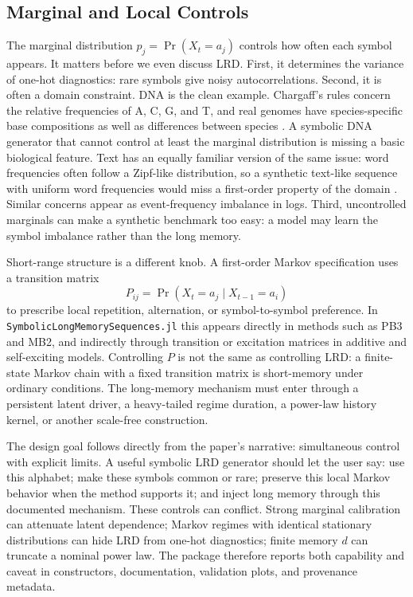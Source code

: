 \documentclass[journal]{IEEEtran}
\newcommand{\pkg}[1]{\texttt{#1}}
\newcommand{\sfive}{\pkg{SymbolicLongMemorySequences.jl}}
\begin{document}
\subsection{Marginal and Local Controls}

The marginal distribution \(p_j=\Pr(X_t=a_j)\) controls how often each symbol
appears.  It matters before we even discuss LRD.  First, it determines the
variance of one-hot diagnostics: rare symbols give noisy autocorrelations.
Second, it is often a domain constraint.  DNA is the clean example.  Chargaff's
rules concern the relative frequencies of A, C, G, and T, and real genomes have
species-specific base compositions as well as differences between species
\cite{chargaff1950_chemical}.  A symbolic DNA generator that cannot control at
least the marginal distribution is missing a basic biological feature.  Text has
an equally familiar version of the same issue: word frequencies often follow a
Zipf-like distribution, so a synthetic text-like sequence with uniform word
frequencies would miss a first-order property of the domain
\cite{zipf1949_human}.  Similar concerns appear as event-frequency imbalance in
logs.  Third, uncontrolled marginals can make a synthetic benchmark too easy: a
model may learn the symbol imbalance rather than the long memory.

Short-range structure is a different knob.  A first-order Markov specification
uses a transition matrix
\begin{equation}
  P_{ij}=\Pr(X_t=a_j\mid X_{t-1}=a_i)
\end{equation}
to prescribe local repetition, alternation, or symbol-to-symbol preference.  In
\sfive{} this appears directly in methods such as PB3 and MB2, and indirectly
through transition or excitation matrices in additive and self-exciting models.
Controlling \(P\) is not the same as controlling LRD: a finite-state Markov
chain with a fixed transition matrix is short-memory under ordinary conditions.
The long-memory mechanism must enter through a persistent latent driver, a
heavy-tailed regime duration, a power-law history kernel, or another scale-free
construction.

The design goal follows directly from the paper's narrative: simultaneous
control with explicit limits.  A useful symbolic LRD generator should let the user say: use this alphabet; make these symbols
common or rare; preserve this local Markov behavior when the method supports it; and inject
long memory through this documented mechanism.  These controls can
conflict.  Strong marginal calibration can attenuate latent dependence; Markov
regimes with identical stationary distributions can hide LRD from one-hot
diagnostics; finite memory \(d\) can truncate a nominal power law.  The package
therefore reports both capability and caveat in constructors, documentation,
validation plots, and provenance metadata.
\end{document}
